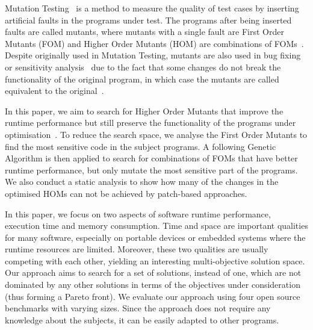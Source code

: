 \documentclass[oribibl]{llncs}
\begin{document}
Mutation Testing~\cite{demillo1978hints,5487526} is a method to measure the quality of test cases by inserting artificial faults in the programs under test.
The programs after being inserted faults are called mutants, where mutants with a single fault are First Order Mutants (FOM) and Higher Order Mutants (HOM) are combinations of FOMs~\cite{Harman:2011:SHO:2025113.2025144}.
Despite originally used in Mutation Testing, mutants are also used in bug fixing~\cite{6035728} or sensitivity analysis~\cite{Wu:2015:DPO:2739480.2754648} due to the fact that some changes do not break the functionality of the original program, in which case the mutants are called equivalent to the original~\cite{weimerGPEM14}.

In this paper, we aim to search for Higher Order Mutants that improve the runtime performance but still preserve the functionality of the programs under optimisation~\cite{Jia:2015:GIU:2739482.2768417}.
To reduce the search space, we analyse the First Order Mutants to find the most sensitive code in the subject programs.
A following Genetic Algorithm is then applied to search for combinations of FOMs that have better runtime performance, but only mutate the most sensitive part of the programs.
We also conduct a static analysis to show how many of the changes in the optimised HOMs can not be achieved by patch-based approaches.

In this paper, we focus on two aspects of software runtime performance, execution time and memory consumption.
Time and space are important qualities for many software, especially on portable devices or embedded systems where the runtime resources are limited.
Moreover, these two qualities are usually competing with each other, yielding an interesting multi-objective solution space.
Our approach aims to search for a set of solutions, instead of one, which are not dominated by any other solutions in terms of the objectives under consideration (thus forming a Pareto front).
We evaluate our approach using four open source benchmarks with varying sizes. 
Since the approach does not require any knowledge about the subjects, it can be easily adapted to other programs.
\end{document}
